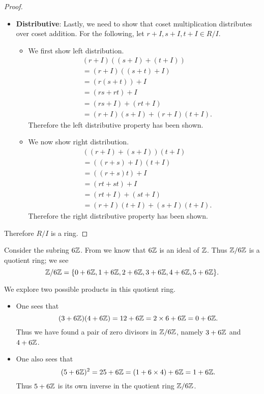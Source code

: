 \begin{proof}
\begin{itemize}
\begin{itemize}
        \end{itemize}
        \item \textbf{Distributive}: Lastly, we need to show that coset multiplication distributes over coset addition. For the following, let $r+I, s+I, t+I \in R/I$.
        \begin{itemize}
            \item We first show left distribution.
            \begin{align*}
                &(r+I)((s+I)+(t+I))\\
                &= (r+I)((s+t)+I)\\
                &= (r(s+t))+I\\
                &= (rs+rt)+I\\
                &= (rs+I) + (rt+I)\\
                &=(r+I)(s+I) + (r+I)(t+I).
            \end{align*}
            Therefore the left distributive property has been shown.

            \item We now show right distribution.
            \begin{align*}
                &((r+I)+(s+I))(t+I)\\
                &= ((r+s)+I)(t+I)\\
                &= ((r+s)t)+I\\
                &= (rt+st)+I\\
                &= (rt+I) + (st+I)\\
                &= (r+I)(t+I) + (s+I)(t+I).
            \end{align*}
            Therefore the right distributive property has been shown.
        \end{itemize}
    \end{itemize}
    Therefore $R/I$ is a ring.
\end{proof}

\begin{example}
    Consider the subring $6\mathbb{Z}$. From  we know that $6\mathbb{Z}$ is an ideal of $\mathbb{Z}$. Thus $\mathbb{Z}/6\mathbb{Z}$ is a quotient ring; we see
    \[
        \mathbb{Z}/6\mathbb{Z} = \{0 + 6\mathbb{Z}, 1+6\mathbb{Z}, 2+6\mathbb{Z}, 3+6\mathbb{Z}, 4+6\mathbb{Z}, 5+6\mathbb{Z}\}.
    \]

    We explore two possible products in this quotient ring.
    \begin{itemize}
        \item One sees that
        \[
            (3+6\mathbb{Z})(4+6\mathbb{Z}) = 12+6\mathbb{Z} = 2\times 6 + 6\mathbb{Z} = 0 + 6\mathbb{Z}.
        \]
        Thus we have found a pair of zero divisors in $\mathbb{Z}/6\mathbb{Z}$, namely $3+6\mathbb{Z}$ and $4+6\mathbb{Z}$.
        
        \item One also sees that
        \[
            (5+6\mathbb{Z})^2 = 25+6\mathbb{Z} = (1 + 6\times4) + 6\mathbb{Z} = 1 + 6\mathbb{Z}.
        \] 
        Thus $5+6\mathbb{Z}$ is its own inverse in the quotient ring $\mathbb{Z}/6\mathbb{Z}$.
    \end{itemize}
\end{example}

